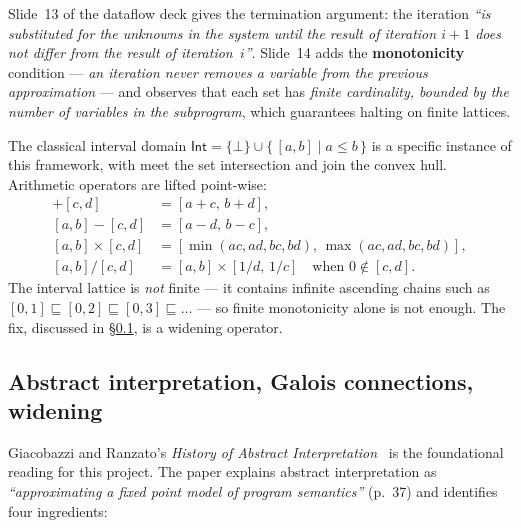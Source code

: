 \documentclass[11pt,a4paper]{article}
\theoremstyle{plain}
\begin{document}
Slide~13 of the dataflow deck gives the termination argument: the
iteration
\emph{``is substituted for the unknowns in the system until the result
of iteration $i+1$ does not differ from the result of iteration~$i$''}.
Slide~14 adds the \textbf{monotonicity} condition --- \emph{an
iteration never removes a variable from the previous approximation}
--- and observes that each set has \emph{finite cardinality, bounded
by the number of variables in the subprogram}, which guarantees
halting on finite lattices.

The classical interval domain
$\mathsf{Int} = \{\bot\} \cup \{\,[a,b] \mid a\le b\,\}$
is a specific instance of this framework, with meet the set
intersection and join the convex hull. Arithmetic operators are
lifted point-wise:
\begin{align*}
[a,b] + [c,d] &= [a+c,\,b+d], \\
[a,b] - [c,d] &= [a-d,\,b-c], \\
[a,b] \times [c,d] &= [\min(ac,ad,bc,bd),\,\max(ac,ad,bc,bd)], \\
[a,b] / [c,d] &= [a,b] \times [1/d,\,1/c] \quad \text{when } 0 \notin [c,d].
\end{align*}
The interval lattice is \emph{not} finite --- it contains infinite
ascending chains such as $[0,1]\sqsubseteq[0,2]\sqsubseteq[0,3]\sqsubseteq\dots$
--- so finite monotonicity alone is not enough. The fix, discussed in
\S\ref{sec:ai}, is a widening operator.

\subsection{Abstract interpretation, Galois connections, widening}
\label{sec:ai}

Giacobazzi and Ranzato's \emph{History of Abstract
Interpretation}~\cite{history-ai} is the foundational reading for
this project. The paper explains abstract interpretation as
\emph{``approximating a fixed point model of program
semantics''} (p.~37) and identifies four ingredients:
\end{document}
